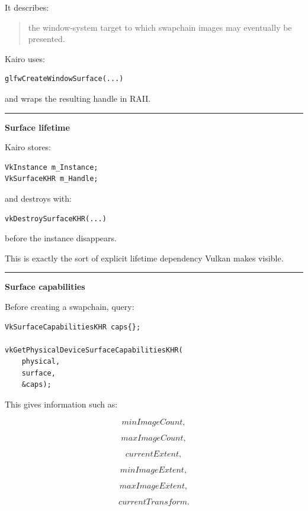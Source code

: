 It describes:

\begin{quote}
the window-system target to which swapchain images may eventually be presented.
\end{quote}

Kairo uses:

\begin{verbatim}
glfwCreateWindowSurface(...)
\end{verbatim}

and wraps the resulting handle in RAII.

\begin{center}\rule{0.5\linewidth}{0.5pt}\end{center}

\textbf{Surface lifetime}

Kairo stores:

\begin{verbatim}
VkInstance m_Instance;
VkSurfaceKHR m_Handle;
\end{verbatim}

and destroys with:

\begin{verbatim}
vkDestroySurfaceKHR(...)
\end{verbatim}

before the instance disappears.

This is exactly the sort of explicit lifetime dependency Vulkan makes visible.

\begin{center}\rule{0.5\linewidth}{0.5pt}\end{center}

\textbf{Surface capabilities}

Before creating a swapchain, query:

\begin{verbatim}
VkSurfaceCapabilitiesKHR caps{};

vkGetPhysicalDeviceSurfaceCapabilitiesKHR(
    physical,
    surface,
    &caps);
\end{verbatim}

This gives information such as:

\[
minImageCount,
\]

\[
maxImageCount,
\]

\[
currentExtent,
\]

\[
minImageExtent,
\]

\[
maxImageExtent,
\]

\[
currentTransform.
\]

